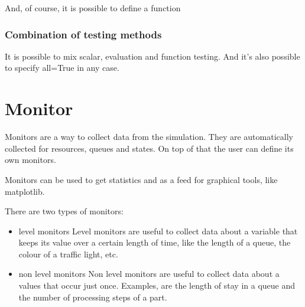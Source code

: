 \documentclass[letterpaper,10pt,english]{sphinxmanual}
\begin{document}
And, of course, it is possible to define a function

\begin{sphinxVerbatim}[commandchars=\\\{\}]
 
        
       


  
  
\end{sphinxVerbatim}


\subsection{Combination of testing methods}
\label{\detokenize{State:combination-of-testing-methods}}
It is possible to mix scalar, evaluation and function testing. And it’s also possible to specify all=True
in any case.


\chapter{Monitor}
\label{\detokenize{Monitor:monitor}}\label{\detokenize{Monitor::doc}}
Monitors are a way to collect data from the simulation. They are automatically collected
for resources, queues and states. On top of that the user can define its own monitors.

Monitors can be used to get statistics and as a feed for graphical tools, like matplotlib.

There are two types of monitors:
\begin{itemize}
\item {} 
level monitors
Level monitors are useful to collect data about a variable that keeps its value over a certain length
of time, like the length of a queue, the colour of a traffic light, etc.

\item {} 
non level monitors
Non level monitors are useful to collect data about a values that occur just once. Examples, are the length of stay in a queue and
the number of processing steps of a part.

\end{itemize}
\end{document}
